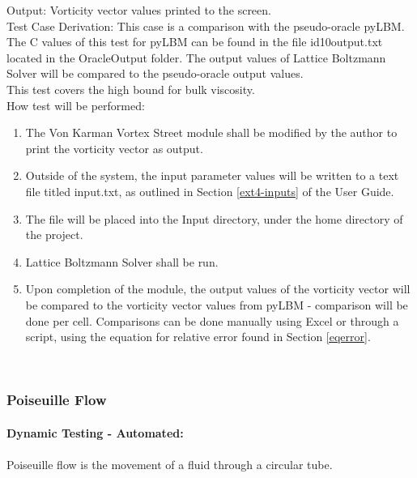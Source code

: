 \documentclass[12pt, titlepage]{article}
\newcommand{\famname}{Lattice Boltzmann Solver}
\begin{document}
\begin{enumerate}
Output: Vorticity vector values printed to the screen. \\ 

Test Case Derivation: This case is a comparison with the pseudo-oracle
pyLBM. The C values of this test for pyLBM can be found in the file
id10output.txt located in the OracleOutput folder. The output values of {\famname} will be compared to the pseudo-oracle output values.\\

This test covers the high bound for bulk viscosity.\\
					
How test will be performed: 

\begin{enumerate}
\item The Von Karman Vortex Street module shall be modified by the author to
  print the vorticity vector as output.
\item Outside of the system, the input parameter values will be written to a text file titled input.txt, as outlined in Section \ref{ext4-inputs} of the User Guide.
\item The file will be placed into the Input directory, under the home directory
of the project.
\item {\famname} shall be run.
\item Upon completion of the module, the output values of the vorticity vector
will be compared to the vorticity vector values from pyLBM - comparison will be
done per cell. Comparisons can be done manually using Excel or through a
script, using the equation for relative error found in Section \ref{eqerror}.\\
\end{enumerate}

\end{enumerate}
~\newpage

\subsubsection{Poiseuille Flow}
\label{frpf}

\paragraph{Dynamic Testing - Automated:}
\paragraph{} 
Poiseuille flow is the movement of a fluid through a circular tube.
\end{document}
